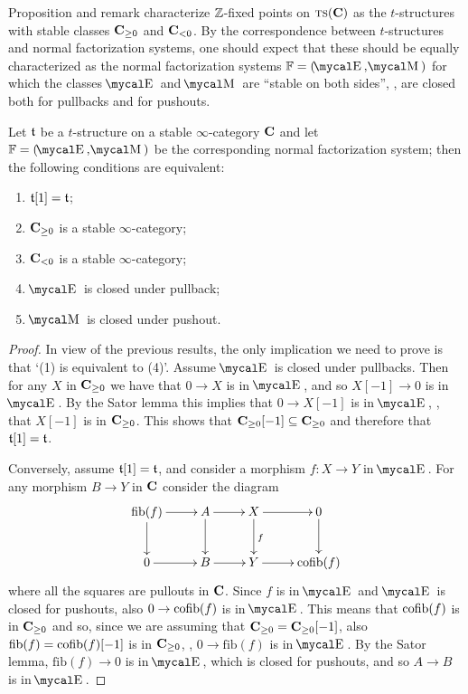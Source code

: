 Proposition  and remark  characterize $\mathbb{Z} $\hyp{}fixed points on $\text{\scshape ts}(\textbf{C})$ as the $t$\hyp{}structures with stable classes $\textbf{C}_{\geq 0}$ and $\textbf{C}_{<0}$. By the correspondence between $t$\hyp{}structures and normal factorization systems, one should expect that these should be equally characterized as the normal factorization systems  $\fF=(\EE,\MM)$ for which the classes $\EE$ and $\MM$ are ``stable on both sides'', \ie, are closed both for pullbacks and for pushouts.
\begin{theorem}\label{enactedstableare}
Let $\mathfrak{t}$ be a $t$\hyp{}structure on a stable $\infty$\hyp{}category $\textbf{C}$ and let $\fF=(\EE,\MM)$ be the corresponding normal factorization system; then the following conditions are equivalent:
\begin{enumerate}
\item $\mathfrak{t}[1]=\mathfrak{t}$;
\item $\textbf{C}_{\geq 0}$ is a stable $\infty$\hyp{}category;
\item $\textbf{C}_{< 0}$ is a stable $\infty$\hyp{}category;
\item $\EE$ is closed under pullback;
\item $\MM$ is closed under pushout.
\end{enumerate}
\end{theorem}
\begin{proof}
In view of the previous results, the only implication we need to prove is that `(1) is equivalent to (4)'. Assume $\EE$ is closed under pullbacks. Then for any $X$ in $\textbf{C}_{\geq 0}$ we have that $0\to X$ is in $\EE$, and so $X[-1]\to 0$ is in $\EE$. By the Sator lemma this implies that $0\to X[-1]$ is in $\EE$, \ie, that $X[-1]$ is in $\textbf{C}_{\geq 0}$. This shows that $\textbf{C}_{\geq 0}[-1]\subseteq \textbf{C}_{\geq 0}$ and therefore that $\mathfrak{t}[1]= \mathfrak{t}$. 

Conversely, assume $\mathfrak{t}[1]=\mathfrak{t}$,
and consider a morphism $f\colon X\to Y$ in $\EE$. For any morphism $B\to Y$ in $\textbf{C}$
consider the diagram
\[
\xymatrix{
\mathrm{fib}(f)\ar[r]\ar[d] & A\ar[r]\ar[d] & X\ar[r]\ar[d]^{f} & 0\ar[d]\\
0 \ar[r] & B\ar[r]  & Y\ar[r]  & \cofib(f)
}
\]
where all the squares are pullouts in $\textbf{C}$. Since $f$ is in $\EE$ and $\EE$ is closed for pushouts, also $0\to \text{cofib}(f)$ is in $\EE$. This means that $\text{cofib}(f)$ is in $\textbf{C}_{\geq 0}$ and so, since we are assuming that $\textbf{C}_{\geq 0}=\textbf{C}_{\geq 0}[-1]$, also $\mathrm{fib}(f)=\text{cofib}(f)[-1]$ is in $\textbf{C}_{\geq 0}$, \ie,  $0\to \mathrm{fib}(f)$ is in $\EE$. By the Sator lemma, $\mathrm{fib}(f)\to 0$ is in $\EE$, which is closed for pushouts, and so $A\to B$ is in $\EE$.
\end{proof}
